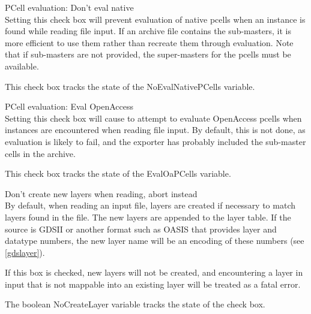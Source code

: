 \begin{description}

\item{\cb PCell evaluation:  Don't eval native}\\
Setting this check box will prevent evaluation of native pcells when
an instance is found while reading file input.  If an archive file
contains the sub-masters, it is more efficient to use them rather than
recreate them through evaluation.  Note that if sub-masters are not
provided, the super-masters for the pcells must be available.
 
This check box tracks the state of the {\et NoEvalNativePCells}
variable.
 
\item{\cb PCell evaluation:  Eval OpenAccess}\\
Setting this check box will cause {\Xic} to attempt to evaluate
OpenAccess pcells when instances are encountered when reading file
input.  By default, this is not done, as evaluation is likely to fail,
and the exporter has probably included the sub-master cells in the
archive.

This check box tracks the state of the {\et EvalOaPCells} variable. 

\item{\cb Don't create new layers when reading, abort instead}\\
By default, when reading an input file, layers are created if
necessary to match layers found in the file.  The new layers are
appended to the layer table.  If the source is GDSII or another format
such as OASIS that provides layer and datatype numbers, the new layer
name will be an encoding of these numbers (see \ref{gdslayer}).

If this box is checked, new layers will not be created, and
encountering a layer in input that is not mappable into an existing
{\Xic} layer will be treated as a fatal error.

The boolean {\et NoCreateLayer} variable tracks the state of the check
box.


\end{description}

